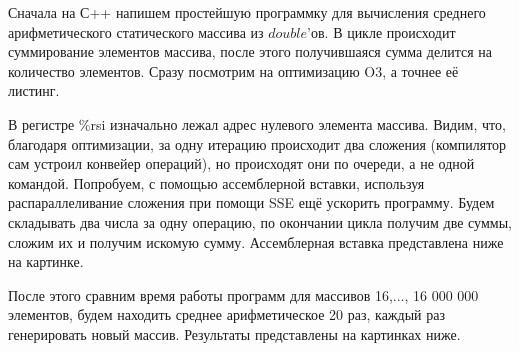 \documentclass[a4paper,12pt]{article}
\begin{document}
Сначала на С++ напишем простейшую программку для вычисления среднего арифметического статического массива из $double$'ов. В цикле происходит суммирование элементов массива, после этого получившаяся сумма делится на количество элементов. Сразу посмотрим на оптимизацию O3, а точнее её листинг.
\begin{figure}[H]\label{fig: listing and code Average double}
\end{figure}
В регистре \%rsi изначально лежал адрес нулевого элемента массива. Видим, что, благодаря оптимизации, за одну итерацию происходит два сложения (компилятор сам устроил конвейер операций), но происходят они по очереди, а не одной командой. Попробуем, с помощью ассемблерной вставки, используя распараллеливание сложения при помощи SSE ещё ускорить программу. Будем складывать два числа за одну операцию, по окончании цикла получим две суммы, сложим их и получим искомую сумму. Ассемблерная вставка представлена ниже на картинке.

После этого сравним время работы программ для массивов 16,..., 16 000 000 элементов, будем находить среднее арифметическое 20 раз, каждый раз генерировать новый массив. Результаты представлены на картинках ниже.
\end{document}
